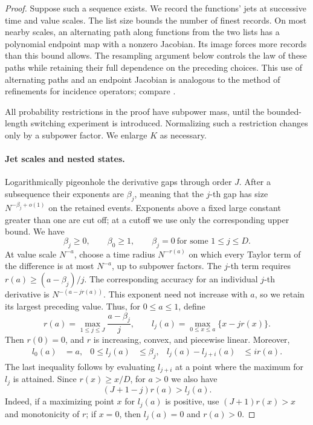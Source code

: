 \begin{proof}
Suppose such a sequence exists.  We record the functions' jets at
successive time and value scales.  The list size bounds the number
of finest records.  On most nearby scales, an alternating path along
functions from the two lists has a polynomial endpoint map with a
nonzero Jacobian.  Its image forces more records than this bound
allows.  The resampling argument below controls the law of these
paths while retaining their full dependence on the preceding choices.
This use of alternating paths and an endpoint Jacobian is analogous
to the method of refinements for incidence operators; compare
\citet[Sections~3--4]{ChristQuasiextremals}.

All probability restrictions in the proof have subpower mass, until
the bounded-length switching experiment is introduced.  Normalizing
such a restriction changes  only by a
subpower factor.  We enlarge \(K\) as necessary.

\paragraph{Jet scales and nested states.}
Logarithmically pigeonhole the derivative gaps through order \(J\).
After a subsequence their exponents are \(\beta_j\), meaning that
the \(j\)-th gap has size \(N^{-\beta_j+o(1)}\) on the retained events.
Exponents above a fixed large constant greater than one are cut off;
at a cutoff we use only the corresponding upper bound.  We have
\[
 \beta_j\ge0,\qquad \beta_0\ge1,\qquad
 \beta_j=0\ \text{for some }1\le j\le D.
\]
At value scale \(N^{-a}\), choose a time radius \(N^{-r(a)}\)
on which every Taylor term of the difference is at most \(N^{-a}\),
up to subpower factors.
The \(j\)-th term requires \(r(a)\ge(a-\beta_j)/j\).
The corresponding accuracy for an individual \(j\)-th derivative
is \(N^{-(a-jr(a))}\).  This exponent need not increase with
\(a\), so we retain its largest preceding value.  Thus, for
\(0\le a\le1\), define
\begin{equation}
 r(a)=\max_{1\le j\le J}\frac{a-\beta_j}{j},
 \qquad
 l_j(a)=\max_{0\le x\le a}\{x-jr(x)\}.
 \label{a02:jet-scales}
\end{equation}
Then \(r(0)=0\), and \(r\) is increasing, convex, and piecewise linear.
Moreover,
\begin{align}
 l_0(a)&=a,&
 0\le l_j(a)&\le\beta_j,&
 l_j(a)-l_{j+i}(a)&\le i r(a).
 \label{a02:translation-exponents}
\end{align}
The last inequality follows by evaluating \(l_{j+i}\) at a point
where the maximum for \(l_j\) is attained.  Since
\(r(x)\ge x/D\), for \(a>0\) we also have
\begin{equation}
 (J+1-j)r(a)>l_j(a).
 \label{a02:remainder-gap}
\end{equation}
Indeed, if a maximizing point \(x\) for \(l_j(a)\) is positive, use
\((J+1)r(x)>x\) and monotonicity of \(r\); if \(x=0\), then
\(l_j(a)=0\) and \(r(a)>0\).


\end{proof}
